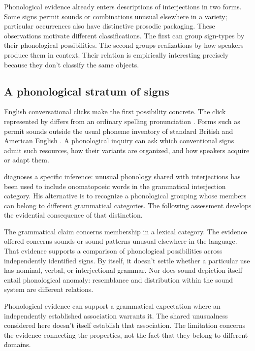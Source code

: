 \documentclass[12pt]{article}
\begin{document}
Phonological evidence already enters descriptions of interjections in two
forms. Some signs permit sounds or combinations unusual elsewhere in a
variety; particular occurrences also have distinctive prosodic packaging.
These observations motivate different classifications. The first can group
sign-types by their phonological possibilities. The second groups realizations
by how speakers produce them in context. Their relation is empirically
interesting precisely because they don't classify the same objects.

\subsection{A phonological stratum of signs}

English conversational clicks make the first possibility concrete. The
click represented by  differs from an ordinary spelling
pronunciation \citep[147]{wilkins1992}. Forms such as  permit
sounds outside the usual phoneme inventory of standard British and
American English \citep[853]{quirk1985}. A phonological inquiry can
ask which conventional signs admit such resources, how their variants are
organized, and how speakers acquire or adapt them.

\textcite[112--113]{ameka1992} diagnoses a specific inference: unusual
phonology shared with interjections has been used to include onomatopoeic
words in the grammatical interjection category. His alternative is to
recognize a phonological grouping whose members can belong to different
grammatical categories. The following assessment develops the evidential
consequence of that distinction.

The grammatical claim concerns membership in a lexical category. The
evidence offered concerns sounds or sound patterns unusual elsewhere in
the language. That evidence supports a comparison of phonological
possibilities across independently identified signs. By itself, it doesn't
settle whether a particular use has nominal, verbal, or interjectional
grammar. Nor does sound depiction itself entail phonological anomaly: resemblance
and distribution within the sound system are different relations.

Phonological evidence can support a grammatical expectation where an
independently established association warrants it. The shared unusualness
considered here doesn't itself establish that association. The limitation
concerns the evidence connecting the properties, not the fact that they
belong to different domains.
\end{document}
